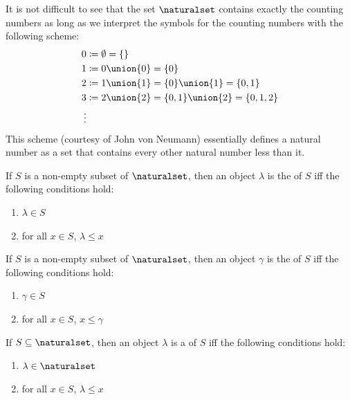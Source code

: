 \begin{rem}
    It is not difficult to see that the set \( \naturalset \) contains exactly the counting numbers
    as long as we interpret the symbols for the counting numbers with the following scheme:
    \begin{align*}
        0 &\coloneq \emptyset = \mleft\{ \mright\} \\
        1 &\coloneq 0 \union \mleft\{ 0 \mright\} = \{0\} \\
        2 &\coloneq 1 \union \mleft\{ 1 \mright\} = \{0\} \union \{1\} = \{0,1\}\\
        3 &\coloneq 2 \union \mleft\{ 2 \mright\} = \{0,1\} \union \{2\} = \{0,1,2\}\\
        \vdots
    \end{align*}
    This scheme (courtesy of John von Neumann) essentially defines a natural number as a set that contains every other natural number less than it.
\end{rem}

\begin{dfn}
     \label{dfn:metatheory-least-element-of-a-non-empty-subset-of-N}
    If \( S \) is a non-empty subset of \( \naturalset \), then an object \( \lambda \) is the  of \( S \)
    iff the following conditions hold:
    \begin{enumerate}[topsep=2pt,label=\textup{\texttt{(\alph*)}}]
        \item \( \lambda \in S \)
        \item for all \( x \in S \), \( \lambda \leq x \)
    \end{enumerate}
\end{dfn}

\begin{dfn}
     \label{dfn:metatheory-greatest-element-of-a-non-empty-subset-of-N}
    If \( S \) is  a non-empty subset of \( \naturalset \), then an object \( \gamma \) is the  of \( S \)
    iff the following conditions hold:
    \begin{enumerate}[topsep=2pt,label=\textup{\texttt{(\alph*)}}]
        \item \( \gamma \in S \)
        \item for all \( x \in S \), \( x \leq \gamma \)
    \end{enumerate}
\end{dfn}

\begin{dfn}
     \label{dfn:metatheory-lower-bound-of-a-subset-of-N}
    If \( S \subseteq \naturalset \), then an object \( \lambda \) is a  of \( S \)
    iff the following conditions hold:
    \begin{enumerate}[topsep=2pt,label=\textup{\texttt{(\alph*)}}]
        \item \( \lambda \in \naturalset \)
        \item for all \( x \in S \), \( \lambda \leq x \)
    \end{enumerate}
\end{dfn}

